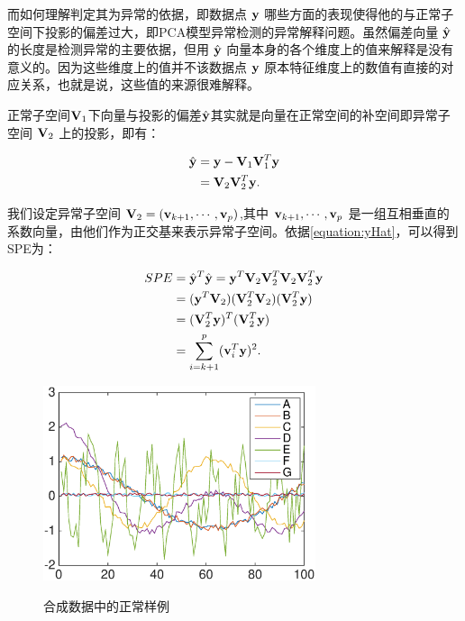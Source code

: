 而如何理解判定其为异常的依据，即数据点 ${\bf y}$ 哪些方面的表现使得他的与正常子空间下投影的偏差过大，即PCA模型异常检测的异常解释问题。虽然偏差向量 $\hat{{\bf y}}$ 的长度是检测异常的主要依据，但用 $\hat{{\bf y}}$ 向量本身的各个维度上的值来解释是没有意义的。因为这些维度上的值并不该数据点 ${\bf y}$ 原本特征维度上的数值有直接的对应关系\cite{PCA-Sensitivity}，也就是说，这些值的来源很难解释。

正常子空间${\bf V}_1$下向量与投影的偏差$\hat{{\bf y}}$其实就是向量在正常空间的补空间即异常子空间 ${\bf V}_2$ 上的投影，即有：

\begin{equation}
\label{equation:yHat}
\begin{split}
\hat{\bf{y}} &= {\bf y}-{\bf V}_1{\bf V}_1^T{\bf y} \\
 & = {\bf V}_2{\bf V}_2^T{\bf y}.
\end{split}
\end{equation}

我们设定异常子空间 ${\bf V}_2=({\bf v}_{k+1}, \cdots, {\bf v}_p)$,其中 ${\bf v}_{k+1},\cdots,{\bf v}_p$ 是一组互相垂直的系数向量，由他们作为正交基来表示异常子空间。依据\ref{equation:yHat}，可以得到SPE为：


\begin{equation}
\label{equation:SPE}
\begin{split}
SPE &= \hat{{\bf y}}^T\hat{{\bf y}} = {\bf y}^T{\bf V}_2 {\bf V}_2^T {\bf V}_2 {\bf V}_2^T {\bf y}\\
       & = ({\bf y}^T{\bf V}_2)({\bf V}_2^T {\bf V}_2)({\bf V}_2^T {\bf y})\\
       & = ({\bf V}_2^T {\bf y})^T({\bf V}_2^T {\bf y})\\
       & = \sum_{i=k+1}^{p}({\bf v}_i^T {\bf y})^2.
\end{split}
\end{equation}


\begin{figure}
	\centering
	\includegraphics[width=80mm]{figure/lines/synthesized_data}
	\label{fig:synthesized_data}
	\caption{合成数据中的正常样例}
\end{figure}


